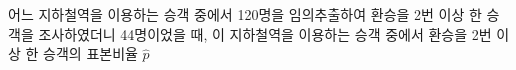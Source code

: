 어느 지하철역을 이용하는 승객 중에서 120명을 임의추출하여 환승을 2번 이상 한 승객을 조사하였더니 44명이었을 때, 이 지하철역을 이용하는 승객 중에서 환승을 2번 이상 한 승객의 표본비율 $\hat{p}$
